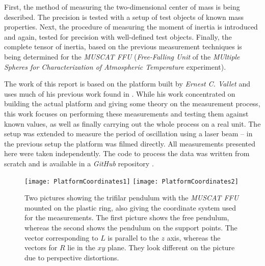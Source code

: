 \documentclass[journal]{IEEEtran}
\begin{document}
First, the method of measuring the two-dimensional center of mass is being described. The precision is tested with a setup of test objects of known mass properties.
Next, the procedure of measuring the moment of inertia is introduced and again, tested for precision with well-defined test objects.
Finally, the complete tensor of inertia, based on the previous measurement techniques is being determined for the \emph{MUSCAT FFU} (\emph{Free-Falling Unit} of the \emph{MUltiple Spheres for Characterization of Atmospheric Temperature} experiment).

The work of this report is based on the platform built by \emph{Ernest C. Vallet} and uses much of his previous work found in \cite{report:ernest}.
While his work concentrated on building the actual platform and giving some theory on the measurement process, this work focuses on performing these measurements and testing them against known values, as well as finally carrying out the whole process on a real unit.
The setup was extended to measure the period of oscillation using a laser beam -- in the previous setup the platform was filmed directly. All measurements presented here were taken independently. The code to process the data was written from scratch and is available in a \emph{GitHub} repository \cite{website:github}.

% 
% 
% 
% 

\begin{figure*}
	\centering
	\texttt{[image: PlatformCoordinates1]}
	\texttt{[image: PlatformCoordinates2]}
	\caption{Two pictures showing the trifilar pendulum with the \emph{MUSCAT FFU} mounted on the plastic ring, also giving the coordinate system used for the measurements. The first picture shows the free pendulum, whereas the second shows the pendulum on the support points. The vector corresponding to $L$ is parallel to the $z$ axis, whereas the vectors for $R$ lie in the $xy$ plane. They look different on the picture due to perspective distortions.}
	\label{fig:Platform}
\end{figure*}
\end{document}
